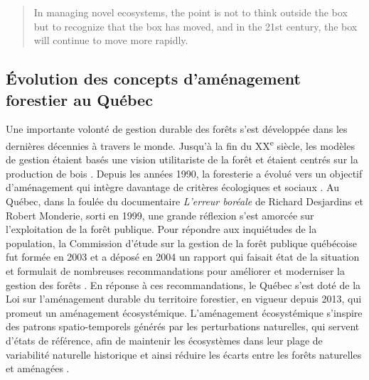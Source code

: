 \begin{quote}
In managing novel ecosystems, the point is not to think outside the box
but to recognize that the box has moved, and in the 21st century, the
box will continue to move more rapidly.
\end{quote}

\hypertarget{uxe9volution-des-concepts-damuxe9nagement-forestier-au-quuxe9bec}{%
\subsection{Évolution des concepts d'aménagement forestier au
Québec}\label{uxe9volution-des-concepts-damuxe9nagement-forestier-au-quuxe9bec}}

Une importante volonté de gestion durable des forêts s'est développée
dans les dernières décennies à travers le monde. Jusqu'à la fin du
XX\textsuperscript{e} siècle, les modèles de gestion étaient basés une
vision utilitariste de la forêt et étaient centrés sur la production de
bois \citep{kuuluvainen_natural_2012}. Depuis les années 1990, la
foresterie a évolué vers un objectif d'aménagement qui intègre davantage
de critères écologiques et sociaux \citep{messier_managing_2013}. Au
Québec, dans la foulée du documentaire \emph{L'erreur boréale} de
Richard Desjardins et Robert Monderie, sorti en 1999, une grande
réflexion s'est amorcée sur l'exploitation de la forêt publique. Pour
répondre aux inquiétudes de la population, la Commission d'étude sur la
gestion de la forêt publique québécoise fut formée en 2003 et a déposé
en 2004 un rapport qui faisait état de la situation et formulait de
nombreuses recommandations pour améliorer et moderniser la gestion des
forêts
\citep{commission_detude_sur_la_gestion_de_la_foret_publique_quebecoise_commission_2004}.
En réponse à ces recommandations, le Québec s'est doté de la Loi sur
l'aménagement durable du territoire forestier, en vigueur depuis 2013,
qui promeut un aménagement écosystémique. L'aménagement écosystémique
s'inspire des patrons spatio-temporels générés par les perturbations
naturelles, qui servent d'états de référence, afin de maintenir les
écosystèmes dans leur plage de variabilité naturelle historique et ainsi
réduire les écarts entre les forêts naturelles et aménagées
\citep{attiwill_disturbance_1994, vaillancourt_implementation_2009}.

